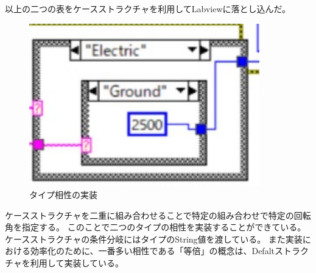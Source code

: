 \documentclass[a4paper,titlepage,11pt]{ltjsarticle}
\begin{document}
以上の二つの表をケースストラクチャを利用してLabviewに落とし込んだ。
\begin{figure}[H]
  \begin{center}
    \includegraphics[width=100mm]{typechart_lab.pdf}
    \caption{タイプ相性の実装}
  \end{center}
\end{figure}
ケースストラクチャを二重に組み合わせることで特定の組み合わせで特定の回転角を指定する。
このことで二つのタイプの相性を実装することができている。ケースストラクチャの条件分岐にはタイプのString値を渡している。
また実装における効率化のために、一番多い相性である「等倍」の概念は、Defaltストラクチャを利用して実装している。
\end{document}
